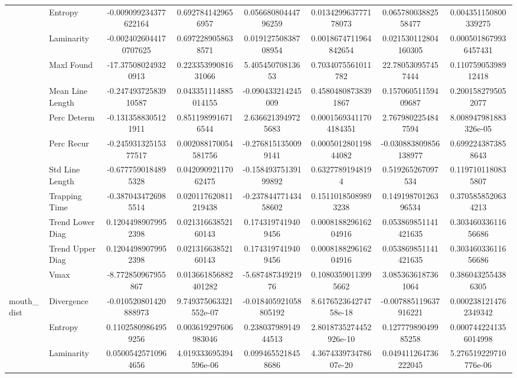 \begin{tabular}{llcc|cc|cc}
 & Entropy & -0.009099234377622164 & 0.6927841429656957 & 0.05668080444796259 & 0.013429963777178073 & 0.06578003882558477 & 0.004351150800339275 \\
 & Laminarity & -0.0024026044170707625 & 0.6972289058638571 & 0.01912750838708954 & 0.0018674711964842654 & 0.021530112804160305 & 0.0005018679936457431 \\
 & Maxl Found & -17.375080249320913 & 0.22335399081631066 & 5.40545070813653 & 0.7034075561011782 & 22.780530957457444 & 0.11075905398912418 \\
 & Mean Line Length & -0.24749372583910587 & 0.043351114885014155 & -0.090433214245009 & 0.45804808738391867 & 0.15706051159409687 & 0.2001582795052077 \\
 & Perc Determ & -0.1313588305121911 & 0.8511989916716544 & 2.6366213949725683 & 0.00015693411704184351 & 2.7679802254847594 & 8.008947981883326e-05 \\
 & Perc Recur & -0.24593132515377517 & 0.002088170054581756 & -0.2768151350099141 & 0.000501280119844082 & -0.030883809856138977 & 0.6992243873858643 \\
 & Std Line Length & -0.6777590184895328 & 0.04209092117062475 & -0.15849375139199892 & 0.63277891948194 & 0.519265267097534 & 0.1197101180835807 \\
 & Trapping Time & -0.3870434726985514 & 0.020117620811219438 & -0.23784477143458602 & 0.15110185089893238 & 0.14919870126396534 & 0.3705858520634213 \\
 & Trend Lower Diag & 0.12044989079952398 & 0.02131663852160143 & 0.1743197419409456 & 0.000818829616204916 & 0.053869851141421635 & 0.30346033611656686 \\
 & Trend Upper Diag & 0.12044989079952398 & 0.02131663852160143 & 0.1743197419409456 & 0.000818829616204916 & 0.053869851141421635 & 0.30346033611656686 \\
 & Vmax & -8.772850967955867 & 0.013661856882401282 & -5.68748734921976 & 0.10803590113995662 & 3.0853636187361064 & 0.3860432554386305 \\
\midrule
\multirow{12}{*}{mouth_dist} & Divergence & -0.010520801420888973 & 9.749375063321552e-07 & -0.018405921058805192 & 8.617652364274758e-18 & -0.007885119637916221 & 0.0002381214762349342 \\
 & Entropy & 0.11025809864959256 & 0.003619297606983046 & 0.23803798914944513 & 2.8018735274452926e-10 & 0.12777989049985258 & 0.0007442241356014998 \\
 & Laminarity & 0.05005425710964656 & 4.019333695394596e-06 & 0.0994655218458686 & 4.367433973478607e-20 & 0.049411264736222045 & 5.276519229710776e-06 \\

\end{tabular}
